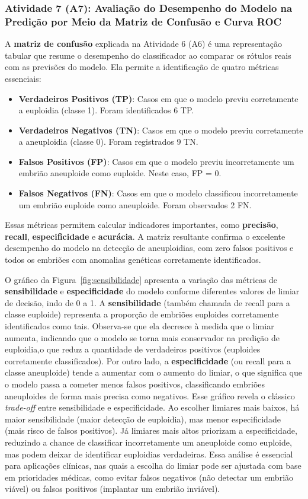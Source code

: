 \subsubsection{Atividade 7 (A7): Avaliação do Desempenho do Modelo na Predição por Meio da Matriz de Confusão e Curva ROC}
A \textbf{matriz de confusão} explicada na Atividade 6 (A6) é uma representação tabular que resume o desempenho do classificador ao comparar os rótulos reais com as previsões do modelo. Ela permite a identificação de quatro métricas essenciais:

\begin{itemize}
    \item \textbf{Verdadeiros Positivos (TP)}: Casos em que o modelo previu corretamente a euploidia (classe 1). Foram identificados 6 TP.
    \item \textbf{Verdadeiros Negativos (TN)}: Casos em que o modelo previu corretamente a aneuploidia (classe 0). Foram registrados 9 TN.
    \item \textbf{Falsos Positivos (FP)}: Casos em que o modelo previu incorretamente um embrião aneuploide como euploide. Neste caso, FP = 0.
    \item \textbf{Falsos Negativos (FN)}: Casos em que o modelo classificou incorretamente um embrião euploide como aneuploide. Foram observados 2 FN.
\end{itemize}

Essas métricas permitem calcular indicadores importantes, como \textbf{precisão}, \textbf{recall}, \textbf{especificidade} e \textbf{acurácia}. A matriz resultante confirma o excelente desempenho do modelo na detecção de aneuploidias, com zero falsos positivos e todos os embriões com anomalias genéticas corretamente identificados.

O gráfico da Figura~\ref{fig:sensibilidade} apresenta a variação das métricas de \textbf{sensibilidade} e \textbf{especificidade} do modelo conforme diferentes valores de limiar de decisão, indo de 0 a 1. A \textbf{sensibilidade} (também chamada de recall para a classe euploide) representa a proporção de embriões euploides corretamente identificados como tais. Observa-se que ela decresce à medida que o limiar aumenta, indicando que o modelo se torna mais conservador na predição de euploidia,o que reduz a quantidade de verdadeiros positivos (euploides corretamente classificados). Por outro lado, a \textbf{especificidade} (ou recall para a classe aneuploide) tende a aumentar com o aumento do limiar, o que significa que o modelo passa a cometer menos falsos positivos, classificando embriões aneuploides de forma mais precisa como negativos. Esse gráfico revela o clássico \textit{trade-off} entre sensibilidade e especificidade. Ao escolher limiares mais baixos, há maior sensibilidade (maior detecção de euploidia), mas menor especificidade (mais risco de falsos positivos). Já limiares mais altos priorizam a especificidade, reduzindo a chance de classificar incorretamente um aneuploide como euploide, mas podem deixar de identificar euploidias verdadeiras. Essa análise é essencial para aplicações clínicas, nas quais a escolha do limiar pode ser ajustada com base em prioridades médicas, como evitar falsos negativos (não detectar um embrião viável) ou falsos positivos (implantar um embrião inviável).

